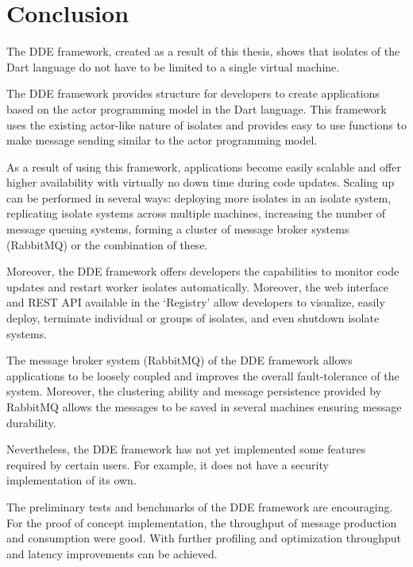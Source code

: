 \chapter{Conclusion}\label{chapter:conclusion}

  The DDE framework, created as a result of this thesis, shows that isolates of the Dart language do not have to be limited to a single virtual machine.

  The DDE framework provides structure for developers to create applications based on the actor programming model in the Dart language. This framework uses the existing actor-like nature of isolates and provides easy to use functions to make message sending similar to the actor programming model.

  As a result of using this framework, applications become easily scalable and offer higher availability with virtually no down time during code updates. Scaling up can be performed in several ways: deploying more isolates in an isolate system, replicating isolate systems across multiple machines, increasing the number of message queuing systems, forming a cluster of message broker systems (RabbitMQ) or the combination of these.

  Moreover, the DDE framework offers developers the capabilities to monitor code updates and restart worker isolates automatically. Moreover, the web interface and REST API available in the ‘Registry’ allow developers to visualize, easily deploy, terminate individual or groups of isolates, and even shutdown isolate systems.

  The message broker system (RabbitMQ) of the DDE framework allows applications to be loosely coupled and improves the overall fault-tolerance of the system. Moreover, the clustering ability and message persistence provided by RabbitMQ allows the messages to be saved in several machines ensuring message durability.

  Nevertheless, the DDE framework has not yet implemented some features required by certain users. For example, it does not have a security implementation of its own.

  The preliminary tests and benchmarks of the DDE framework are encouraging. For the proof of concept implementation, the throughput of message production and consumption were good. With further profiling and optimization throughput and latency improvements can be achieved.

